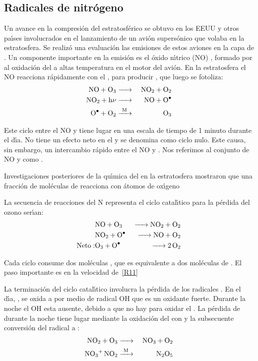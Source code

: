 \subsection{Radicales de nitr\'ogeno}\label{rno3}
Un avance en la compresi\'on del    estratosf\'erico se obtuvo en los EEUU y otros pa\'{\i}ses involucrados en el lanzamiento de un avi\'on supers\'onico que volaba en la estratosfera.  Se realiz\'o una evaluaci\'on las emisiones de estos aviones en la capa de .  Un componente importante en la emisi\'on es el \'oxido n\'{\i}trico (NO) , formado por al oxidaci\'on del  a altas temperatura en el motor del avi\'on. En la estratosfera el NO reacciona r\'apidamente con el , para producir   , que luego se fotoliza:
\begin{eqnarray*}
 \ce{NO + O3       & -> &NO2 + O2 \\
  NO2 +  h$\nu$  &  -> &NO + O^. \\
   O^. + O2          &  ->[M] & O3}
\end{eqnarray*}


Este ciclo entre el NO y  tiene lugar en una escala de tiempo de 1 minuto durante el d\'{\i}a. No tiene un efecto neto en el  y se denomina como ciclo nulo. Este causa, sin embargo, un intercambio r\'apido entre el NO y . Nos referimos al conjunto de NO y  como .

Investigaciones posteriores de la qu\'{\i}mica del  en la estratosfera mostraron que una fracci\'on de mol\'eculas de  reacciona con \'atomos de ox\'{\i}geno 


La secuencia de reacciones del N representa el ciclo catal\'{\i}tico para la p\'erdida del ozono  ser\'{\i}an:
\begin{eqnarray}
            & \ce{NO + O3     &->   NO2 + O2} \label{R10} \\
            &\ce{NO2 +  O^.   & ->   NO + O2 } \label{R11} \\
  \mathrm{Neto: } &\ce{O3 + O^.  &->  2O2}\nonumber 
\end{eqnarray}

Cada ciclo consume dos mol\'eculas  , que es equivalente a dos mol\'eculas de . El paso importante es en la velocidad de~\ref{R11}

La terminaci\'on del ciclo catal\'{\i}tico involucra la p\'erdida de los radicales . En el d\'{\i}a,  , se oxida a   por medio de radical OH que es un oxidante fuerte.
Durante la noche el OH esta ausente, debido a que no hay  para oxidar el . La p\'erdida de   durante la noche tiene lugar mediante la oxidaci\'on del  con  y la subsecuente conversi\'on del radical  a :
\begin{eqnarray*}
 \ce{NO2 + O3    & ->       & NO3 + O2 \\
       NO3+ NO2  &  ->[M] & N2O5}
\end{eqnarray*}

